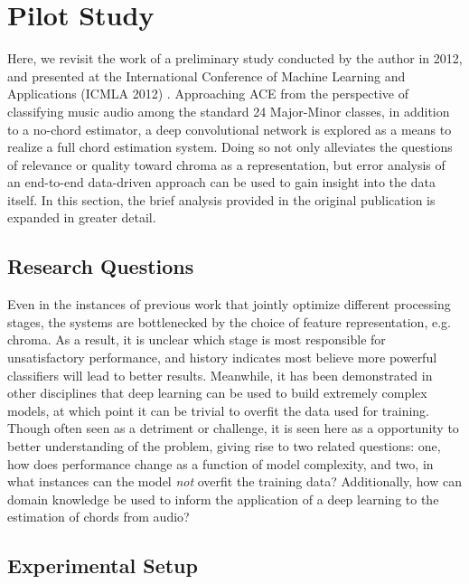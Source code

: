 \section{Pilot Study}
\label{sec:pilot_study}

Here, we revisit the work of a preliminary study conducted by the author in 2012, and presented at the International Conference of Machine Learning and Applications (ICMLA 2012) \cite{Humphrey2012}.
Approaching ACE from the perspective of classifying music audio among the standard 24 Major-Minor classes, in addition to a no-chord estimator, a deep convolutional network is explored as a means to realize a full chord estimation system.
Doing so not only alleviates the questions of relevance or quality toward chroma as a representation, but error analysis of an end-to-end data-driven approach can be used to gain insight into the data itself.
In this section, the brief analysis provided in the original publication is expanded in greater detail.


\subsection{Research Questions}
\label{subsec:research_questions}

Even in the instances of previous work that jointly optimize different processing stages, the systems are bottlenecked by the choice of feature representation, e.g. chroma.
As a result, it is unclear which stage is most responsible for unsatisfactory performance, and history indicates most believe more powerful classifiers will lead to better results.
Meanwhile, it has been demonstrated in other disciplines that deep learning can be used to build extremely complex models, at which point it can be trivial to overfit the data used for training.
Though often seen as a detriment or challenge, it is seen here as a opportunity to better understanding of the problem, giving rise to two related questions: one, how does performance change as a function of model complexity, and two, in what instances can the model \emph{not} overfit the training data?
Additionally, how can domain knowledge be used to inform the application of a deep learning to the estimation of chords from audio?


\subsection{Experimental Setup}
\label{subsec:experimental_setup}


